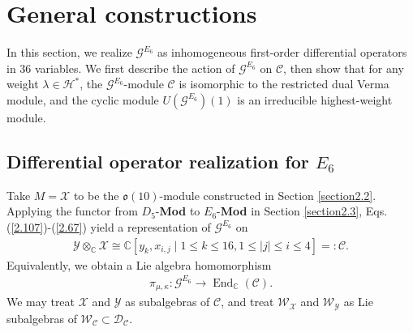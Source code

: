 \documentclass[12pt]{article}
\numberwithin{equation}{section}
\theoremstyle{definition}
\theoremstyle{remark}
\begin{document}
\section{General constructions}\label{section3}
In this section, we realize $\mathscr{G}^{E_6}$ as inhomogeneous first-order differential operators in $36$ variables. We first describe the action of $\mathscr{G}^{E_6}$ on $\mathscr{C}$, then show that for any weight $\lambda\in \mathscr{H}^*$, the $\mathscr{G}^{E_6}$-module $\mathscr{C}$ is isomorphic to the restricted dual Verma module, and the cyclic module $U(\mathscr{G}^{E_6})(1)$ is an irreducible highest-weight module. 

\subsection{Differential operator realization for $E_6$}\label{section3.1}
Take $M=\mathscr{X}$ to be the $\mathfrak{o}(10)$-module constructed in Section \ref{section2.2}. Applying the functor from $D_5$-\textbf{Mod} to $E_6$-\textbf{Mod} in Section \ref{section2.3}, Eqs. (\ref{2.107})-(\ref{2.67}) yield a representation of $\mathscr{G}^{E_{6}}$  on
\begin{eqnarray}
	\mathscr{Y}\otimes_{\mathbb{C}}\mathscr{X}\cong \mathbb{C}[y_k,x_{i,j}\mid 1\leqslant k\leqslant 16, 1\leqslant |j|\leqslant i\leqslant 4]=:\mathscr{C}.
\end{eqnarray}
Equivalently, we obtain a Lie algebra homomorphism
\begin{eqnarray}
	\pi_{\mu,\kappa}:\mathscr{G}^{E_6}\longrightarrow \operatorname{End}_{\mathbb{C}}(\mathscr{C}).
\end{eqnarray}
We may treat $\mathscr{X}$ and $\mathscr{Y}$ as subalgebras of $\mathscr{C}$, and treat $\mathscr{W}_{\mathscr{X}}$ and $\mathscr{W}_{\mathscr{Y}}$ as Lie subalgebras of $\mathscr{W}_{\mathscr{C}}\subset\mathscr{D}_{\mathscr{C}}$.
\end{document}
